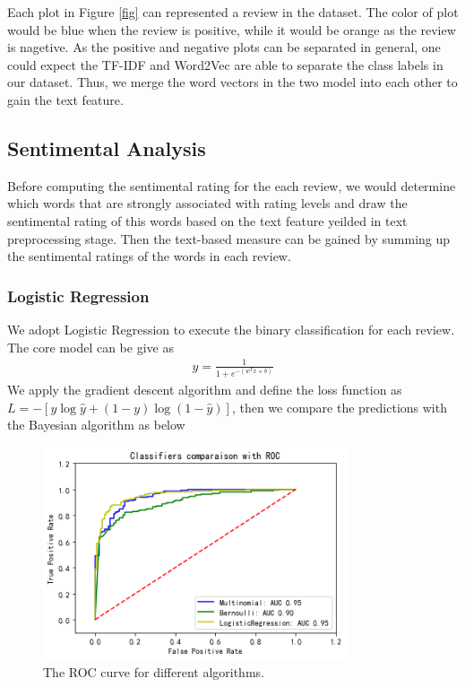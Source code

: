 \documentclass[12pt]{article}%
\begin{document}
Each plot in Figure \ref{fig} can represented a review in the dataset. The color of plot would be blue when the review is positive, while it would be orange as the review is nagetive. As the positive and negative plots can be separated in general, one could expect the TF-IDF and Word2Vec are able to separate the class labels in our dataset. Thus, we merge the word vectors in the two model into each other to gain the text feature.  

\subsection{Sentimental Analysis}
Before computing the sentimental rating for the each review, we would determine which words that are strongly associated with rating levels and draw the sentimental rating of this words based on the text feature yeilded in text preprocessing stage. Then the text-based measure can be gained by summing up the sentimental ratings of the words in each review. 

\subsubsection{Logistic Regression}
We adopt Logistic Regression to execute the binary classification for each review. The core model can be give as
\begin{gather}
y=\frac{1}{1+e^{-\left(w^{T} x+b\right)}}
\end{gather}
We apply the gradient descent algorithm and define the loss function as $L=-[y \log \hat{y}+(1-y) \log (1-\hat{y})]$, then we compare the predictions with the Bayesian algorithm \cite{bbb} as below

	\begin{figure}[H]
	\centering
	\includegraphics[width=0.8\textwidth]{111.png}%
	\caption{The ROC curve for different algorithms.}\label{llll}%
\end{figure}
\end{document}
